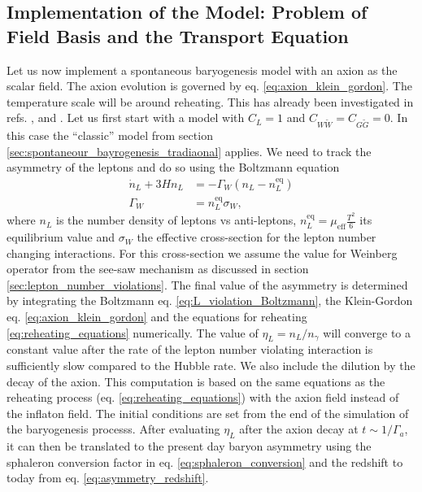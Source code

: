 \documentclass[13pt,a4paper,titlepage]{article}
\begin{document}
\subsection{Implementation of the Model: Problem of Field Basis and the Transport Equation}
\label{sec:model}

Let us now implement a spontaneous baryogenesis model with an axion as the scalar field.
The axion evolution is governed by eq. \eqref{eq:axion_klein_gordon}.
The temperature scale will be around reheating. This has already been investigated in refs. \cite{Axion_leptogenesis_Kusenko_2015}, \cite{Axioleptogenesis_Co_2021} and \cite{Domcke:2020kcp_Generic_Couplings}.
Let us first start with a model with $C_L = 1$ and $C_{W \tilde{W}} = C_{G \tilde{G}} = 0$.
In this case the ``classic'' model from section \ref{sec:spontaneour_bayrogenesis_tradiaonal} applies.
We need to track the asymmetry of the leptons and do so using the Boltzmann equation \cite[eq. 7]{Axion_leptogenesis_Kusenko_2015}
\begin{align}
    \label{eq:L_violation_Boltzmann}
    \dot{n}_L + 3 H n_L &= - \Gamma_W (n_L - n_L^\mathrm{eq}) \\
    \Gamma_W &= n^\mathrm{eq}_L \sigma_W,
\end{align}
where $n_L$ is the number density of leptons vs anti-leptons, $n_L^\mathrm{eq} = \mu_\mathrm{eff} \frac{T^2}{6}$ its equilibrium value and $\sigma_W$ the effective cross-section for the lepton number
changing interactions. For this cross-section we assume the value for Weinberg operator from the see-saw mechanism as discussed in section \ref{sec:lepton_number_violations}.
The final value of the asymmetry is determined by integrating the Boltzmann eq. \eqref{eq:L_violation_Boltzmann}, the Klein-Gordon eq. \eqref{eq:axion_klein_gordon} and the
equations for reheating \eqref{eq:reheating_equations} numerically.
The value of $\eta_L = n_L / n_\gamma$ will converge to
a constant value after the rate of the lepton number violating interaction is sufficiently slow compared to the Hubble rate.
We also include the dilution by the decay of the axion. This computation is based on the same equations
as the reheating process (eq. \eqref{eq:reheating_equations}) with the axion field instead of the
inflaton field. The initial conditions are set from the end of the simulation of the baryogenesis
processs.
After evaluating $\eta_L$ after the axion decay at $t \sim 1/\Gamma_a$, it can then be translated to
the present day baryon asymmetry using the sphaleron conversion factor in eq. \eqref{eq:sphaleron_conversion} and the redshift to today from eq. \eqref{eq:asymmetry_redshift}.
\end{document}
